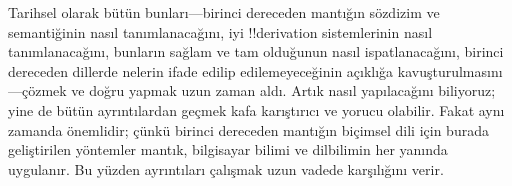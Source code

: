 \documentclass[../../../include/open-logic-section]{subfiles}
\begin{document}
Tarihsel olarak bütün bunları---birinci dereceden mantığın sözdizim ve
semantiğinin nasıl tanımlanacağını, iyi !!{derivation} sistemlerinin
nasıl tanımlanacağını, bunların sağlam ve tam olduğunun nasıl
ispatlanacağını, birinci dereceden dillerde nelerin ifade edilip
edilemeyeceğinin açıklığa kavuşturulmasını---çözmek ve doğru yapmak uzun
zaman aldı. Artık nasıl yapılacağını biliyoruz; yine de bütün
ayrıntılardan geçmek kafa karıştırıcı ve yorucu olabilir. Fakat aynı
zamanda önemlidir; çünkü birinci dereceden mantığın biçimsel dili için
burada geliştirilen yöntemler mantık, bilgisayar bilimi ve dilbilimin
her yanında uygulanır. Bu yüzden ayrıntıları çalışmak uzun vadede
karşılığını verir.
\end{document}
